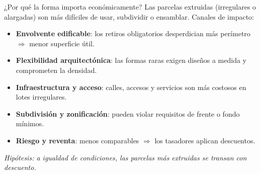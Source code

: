 \documentclass[11pt,aspectratio=169]{beamer}
\begin{document}
\begin{frame}{¿Por qué la forma importa económicamente?}
  Las parcelas \alert{extruidas} (irregulares o alargadas) son más difíciles de usar, subdividir o ensamblar. Canales de impacto:
  \vspace{0.5em}
  \begin{itemize}
    \item \textbf{Envolvente edificable}: los retiros obligatorios desperdician más perímetro $\Rightarrow$ menor superficie útil.
    \item \textbf{Flexibilidad arquitectónica}: las formas raras exigen diseños a medida y comprometen la densidad.
    \item \textbf{Infraestructura y acceso}: calles, accesos y servicios son más costosos en lotes irregulares.
    \item \textbf{Subdivisión y zonificación}: pueden violar requisitos de frente o fondo mínimos.
    \item \textbf{Riesgo y reventa}: menos comparables $\Rightarrow$ los tasadores aplican descuentos.
  \end{itemize}
  \vspace{0.4em}
  \begin{center}
    \itshape Hipótesis: a igualdad de condiciones, las parcelas más extruidas se transan con descuento.
  \end{center}
\end{frame}

\end{document}
